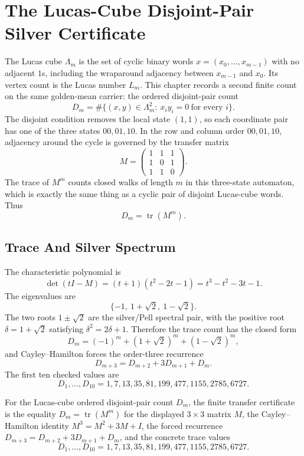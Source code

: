 \chapter{The Lucas-Cube Disjoint-Pair Silver Certificate}
\label{ch:concrete-instances-lucas-cube-disjoint-pair-silver}

The Lucas cube $\Lambda_m$ is the set of cyclic binary words $x=(x_0,\ldots,x_{m-1})$ with no adjacent $1$s, including the wraparound adjacency between $x_{m-1}$ and $x_0$. Its vertex count is the Lucas number $L_m$. This chapter records a second finite count on the same golden-mean carrier: the ordered disjoint-pair count
$$
D_m=\#\{(x,y)\in\Lambda_m^2:\ x_i y_i=0\ \text{for every }i\}.
$$
The disjoint condition removes the local state $(1,1)$, so each coordinate pair has one of the three states $00,01,10$. In the row and column order $00,01,10$, adjacency around the cycle is governed by the transfer matrix
$$
M=
\begin{pmatrix}
1&1&1\\
1&0&1\\
1&1&0
\end{pmatrix}.
$$
The trace of $M^m$ counts closed walks of length $m$ in this three-state automaton, which is exactly the same thing as a cyclic pair of disjoint Lucas-cube words. Thus
$$
D_m=\operatorname{tr}(M^m).
$$

\section{Trace And Silver Spectrum}
\label{sec:lucas-cube-disjoint-pair-silver-trace}

The characteristic polynomial is
$$
\det(tI-M)=(t+1)(t^2-2t-1)=t^3-t^2-3t-1.
$$
The eigenvalues are
$$
\{-1,\ 1+\sqrt2,\ 1-\sqrt2\}.
$$
The two roots $1\pm\sqrt2$ are the silver/Pell spectral pair, with the positive root $\delta=1+\sqrt2$ satisfying $\delta^2=2\delta+1$. Therefore the trace count has the closed form
$$
D_m=(-1)^m+(1+\sqrt2)^m+(1-\sqrt2)^m,
$$
and Cayley--Hamilton forces the order-three recurrence
$$
D_{m+3}=D_{m+2}+3D_{m+1}+D_m.
$$
The first ten checked values are
$$
D_1,\ldots,D_{10}=1,7,13,35,81,199,477,1155,2785,6727.
$$

\begin{theorem}
\label{thm:lucas-cube-disjoint-pair-silver-certificate}
For the Lucas-cube ordered disjoint-pair count $D_m$, the finite transfer certificate is the equality $D_m=\operatorname{tr}(M^m)$ for the displayed $3\times3$ matrix $M$, the Cayley--Hamilton identity $M^3=M^2+3M+I$, the forced recurrence $D_{m+3}=D_{m+2}+3D_{m+1}+D_m$, and the concrete trace values
$$
D_1,\ldots,D_{10}=1,7,13,35,81,199,477,1155,2785,6727.
$$
\end{theorem}


